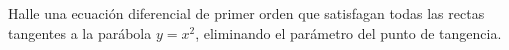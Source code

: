 Halle una ecuación diferencial de primer orden que satisfagan todas las rectas tangentes a la parábola $y=x^2$, eliminando el parámetro del punto de tangencia.

